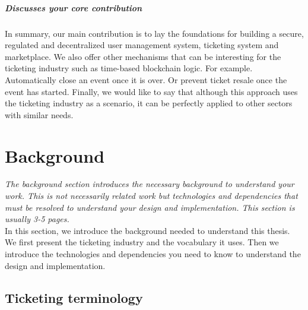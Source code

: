 \documentclass[a4paper,11pt,oneside]{report}
\begin{document}
\paragraph{Discusses your core contribution} In summary, our main contribution is to lay the foundations for building a secure, regulated and decentralized user management system, ticketing system and marketplace. We also offer other mechanisms that can be interesting for the ticketing industry such as time-based blockchain logic. For example. Automatically close an event once it is over. Or prevent ticket resale once the event has started. Finally, we would like to say that although this approach uses the ticketing industry as a scenario, it can be perfectly applied to other sectors with similar needs.

\chapter{Background}

\textit{The background section introduces the necessary background to understand your
work. This is not necessarily related work but technologies and dependencies
that must be resolved to understand your design and implementation.
This section is usually 3-5 pages.} \\

In this section, we introduce the background needed to understand this thesis. We first present the ticketing industry and the vocabulary it uses. Then we introduce the technologies and dependencies you need to know to understand the design and implementation.

\section{Ticketing terminology}
\label{sec:ticketing_terminology}
\end{document}
